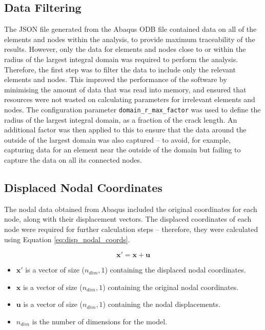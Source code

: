 \newpage
\subsection{Data Filtering}

The JSON file generated from the Abaqus ODB file contained data on all of the elements and nodes within the analysis, to provide maximum traceability of the results. However, only the data for elements and nodes close to or within the radius of the largest integral domain was required to perform the analysis. Therefore, the first step was to filter the data to include only the relevant elements and nodes. This improved the performance of the software by minimising the amount of data that was read into memory, and ensured that resources were not wasted on calculating parameters for irrelevant elements and nodes. The configuration parameter \texttt{domain\_r\_max\_factor} was used to define the radius of the largest integral domain, as a fraction of the crack length. An additional factor was then applied to this to ensure that the data around the outside of the largest domain was also captured -- to avoid, for example, capturing data for an element near the outside of the domain but failing to capture the data on all its connected nodes.

\subsection{Displaced Nodal Coordinates}

The nodal data obtained from Abaqus included the original coordinates for each node, along with their displacement vectors. The displaced coordinates of each node were required for further calculation steps -- therefore, they were calculated using Equation \ref{eq:disp_nodal_coords}.

\begin{equation}\label{eq:disp_nodal_coords}
	\bm{x'} = \bm{x} + \bm{u}
\end{equation}

\begin{itemize}
	\item $\bm{x'}$ is a vector of size ($n_{dim}, 1$) containing the displaced nodal coordinates.
	\item $\bm{x}$ is a vector of size ($n_{dim}, 1$) containing the original nodal coordinates.
	\item $\bm{u}$ is a vector of size ($n_{dim}, 1$) containing the nodal displacements.
	\item $n_{dim}$ is the number of dimensions for the model.
\end{itemize}


